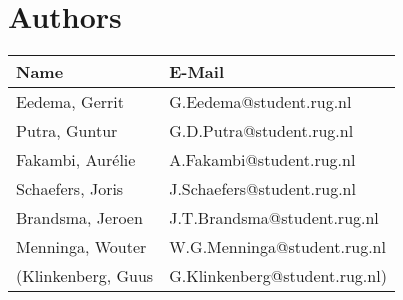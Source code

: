 \section*{Authors}

\begin{tabular}{L{} L{}}
	\textbf{Name}        & \textbf{E-Mail}               \\ \toprule
	Eedema, Gerrit       & G.Eedema@student.rug.nl       \\
	Putra, Guntur        & G.D.Putra@student.rug.nl      \\
	Fakambi, Aur\'{e}lie & A.Fakambi@student.rug.nl      \\
	Schaefers, Joris     & J.Schaefers@student.rug.nl    \\
	Brandsma, Jeroen     & J.T.Brandsma@student.rug.nl   \\
	Menninga, Wouter     & W.G.Menninga@student.rug.nl   \\ 
	(Klinkenberg, Guus   & G.Klinkenberg@student.rug.nl) \\ \bottomrule
\end{tabular}

